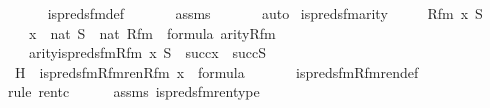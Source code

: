 \begin{isabellebody}
\ \ \ \ \isamarkupfalse%
\ is{\isacharunderscore}{\kern0pt}preds{\isacharunderscore}{\kern0pt}fm{\isacharunderscore}{\kern0pt}def\ \isanewline
\ \ \ \ \isamarkupfalse%
\ assms\ \isanewline
\ \ \ \ \isamarkupfalse%
\ auto\isanewline
{}\isamarkupfalse%
%
\endisatagproof
{\isafoldproof}%
%
\isadelimproof
\isanewline
%
\endisadelimproof
\isanewline
{}\isamarkupfalse%
\ is{\isacharunderscore}{\kern0pt}preds{\isacharunderscore}{\kern0pt}fm{\isacharunderscore}{\kern0pt}arity\ {\isacharcolon}{\kern0pt}\ \isanewline
\ \ \ Rfm\ x\ S\ \isanewline
\ \ \ {\isachardoublequoteopen}x\ {\isasymin}\ nat{\isachardoublequoteclose}\ {\isachardoublequoteopen}S\ {\isasymin}\ nat{\isachardoublequoteclose}\ {\isachardoublequoteopen}Rfm\ {\isasymin}\ formula{\isachardoublequoteclose}\ {\isachardoublequoteopen}arity{\isacharparenleft}{\kern0pt}Rfm{\isacharparenright}{\kern0pt}\ {\isacharequal}{\kern0pt}\ {}{\isachardoublequoteclose}\isanewline
\ \ \ {\isachardoublequoteopen}arity{\isacharparenleft}{\kern0pt}is{\isacharunderscore}{\kern0pt}preds{\isacharunderscore}{\kern0pt}fm{\isacharparenleft}{\kern0pt}Rfm{\isacharcomma}{\kern0pt}\ x{\isacharcomma}{\kern0pt}\ S{\isacharparenright}{\kern0pt}{\isacharparenright}{\kern0pt}\ {\isasymle}\ succ{\isacharparenleft}{\kern0pt}x{\isacharparenright}{\kern0pt}\ {\isasymunion}\ succ{\isacharparenleft}{\kern0pt}S{\isacharparenright}{\kern0pt}{\isachardoublequoteclose}\isanewline
%
\isadelimproof
%
\endisadelimproof
%
\isatagproof
{}\isamarkupfalse%
\ {\isacharminus}{\kern0pt}\ \isanewline
\ \ \isamarkupfalse%
\ H\ {\isacharcolon}{\kern0pt}\ {\isachardoublequoteopen}is{\isacharunderscore}{\kern0pt}preds{\isacharunderscore}{\kern0pt}fm{\isacharunderscore}{\kern0pt}Rfm{\isacharunderscore}{\kern0pt}ren{\isacharparenleft}{\kern0pt}Rfm{\isacharcomma}{\kern0pt}\ x{\isacharparenright}{\kern0pt}\ {\isasymin}\ formula{\isachardoublequoteclose}\ \isanewline
\ \ \ \ \isamarkupfalse%
\ is{\isacharunderscore}{\kern0pt}preds{\isacharunderscore}{\kern0pt}fm{\isacharunderscore}{\kern0pt}Rfm{\isacharunderscore}{\kern0pt}ren{\isacharunderscore}{\kern0pt}def\isanewline
\ \ \ \ \isamarkupfalse%
{\isacharparenleft}{\kern0pt}rule\ ren{\isacharunderscore}{\kern0pt}tc{\isacharparenright}{\kern0pt}\isanewline
\ \ \ \ \isamarkupfalse%
\ assms\ is{\isacharunderscore}{\kern0pt}preds{\isacharunderscore}{\kern0pt}fm{\isacharunderscore}{\kern0pt}ren{\isacharunderscore}{\kern0pt}type\ \isanewline

\end{isabellebody}
